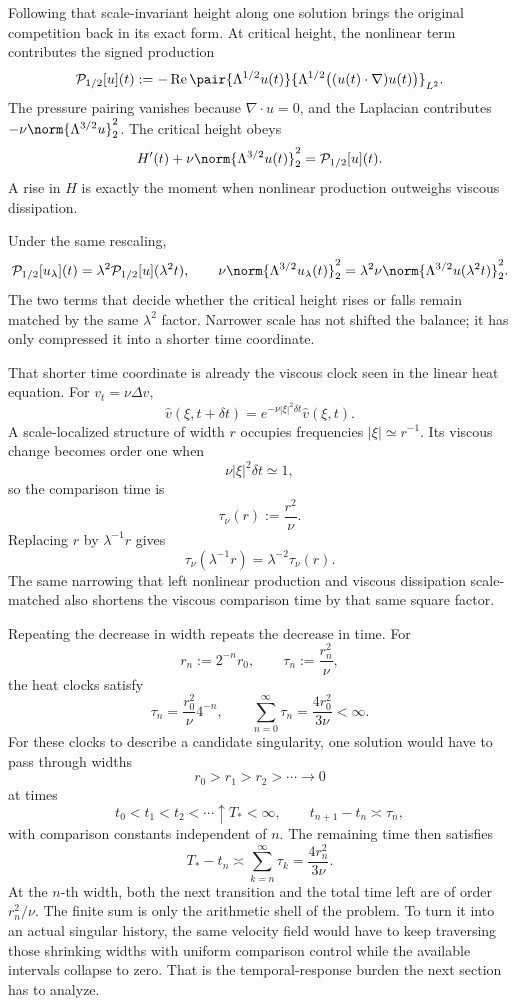 
Following that scale-invariant height along one solution brings the original competition back in its exact form. At critical height, the nonlinear term contributes the signed production
\[
  \mathcal P_{1/2}[u](t)
  :=
  -\operatorname{Re}
  \pair
    {\Lambda^{1/2}u(t)}
    {\Lambda^{1/2}\bigl((u(t)\cdot\nabla)u(t)\bigr)}_{L^2}.
\]
The pressure pairing vanishes because \(\nabla\cdot u=0\), and the Laplacian contributes \(-\nu\norm{\Lambda^{3/2}u}_2^2\). The critical height obeys
\[
  H'(t)
  +
  \nu\norm{\Lambda^{3/2}u(t)}_2^2
  =
  \mathcal P_{1/2}[u](t).
\]
A rise in \(H\) is exactly the moment when nonlinear production outweighs viscous dissipation.

Under the same rescaling,
\[
  \mathcal P_{1/2}[u_\lambda](t)
  =
  \lambda^2\mathcal P_{1/2}[u](\lambda^2t),
  \qquad
  \nu\norm{\Lambda^{3/2}u_\lambda(t)}_2^2
  =
  \lambda^2\nu\norm{\Lambda^{3/2}u(\lambda^2t)}_2^2.
\]
The two terms that decide whether the critical height rises or falls remain matched by the same \(\lambda^2\) factor. Narrower scale has not shifted the balance; it has only compressed it into a shorter time coordinate.


That shorter time coordinate is already the viscous clock seen in the linear heat equation. For \(v_t=\nu\Delta v\),
\[
  \widehat v(\xi,t+\delta t)
  =
  e^{-\nu|\xi|^2\delta t}\widehat v(\xi,t).
\]
A scale-localized structure of width \(r\) occupies frequencies \(|\xi|\simeq r^{-1}\). Its viscous change becomes order one when
\[
  \nu|\xi|^2\delta t\simeq1,
\]
so the comparison time is
\[
  \tau_\nu(r)
  :=
  \frac{r^2}{\nu}.
\]
Replacing \(r\) by \(\lambda^{-1}r\) gives
\[
  \tau_\nu(\lambda^{-1}r)
  =
  \lambda^{-2}\tau_\nu(r).
\]
The same narrowing that left nonlinear production and viscous dissipation scale-matched also shortens the viscous comparison time by that same square factor.


Repeating the decrease in width repeats the decrease in time. For
\[
  r_n:=2^{-n}r_0,
  \qquad
  \tau_n:=\frac{r_n^2}{\nu},
\]
the heat clocks satisfy
\[
  \tau_n
  =
  \frac{r_0^2}{\nu}4^{-n},
  \qquad
  \sum_{n=0}^{\infty}\tau_n
  =
  \frac{4r_0^2}{3\nu}
  <
  \infty.
\]
For these clocks to describe a candidate singularity, one \NavierStokes{} solution would have to pass through widths
\[
  r_0>r_1>r_2>\cdots\longrightarrow0
\]
at times
\[
  t_0<t_1<t_2<\cdots\uparrow T_*<\infty,
  \qquad
  t_{n+1}-t_n\asymp\tau_n,
\]
with comparison constants independent of \(n\). The remaining time then satisfies
\[
  T_*-t_n
  \asymp
  \sum_{k=n}^{\infty}\tau_k
  =
  \frac{4r_n^2}{3\nu}.
\]
At the \(n\)-th width, both the next transition and the total time left are of order \(r_n^2/\nu\). The finite sum is only the arithmetic shell of the problem. To turn it into an actual singular history, the same velocity field would have to keep traversing those shrinking widths with uniform comparison control while the available intervals collapse to zero. That is the temporal-response burden the next section has to analyze.
